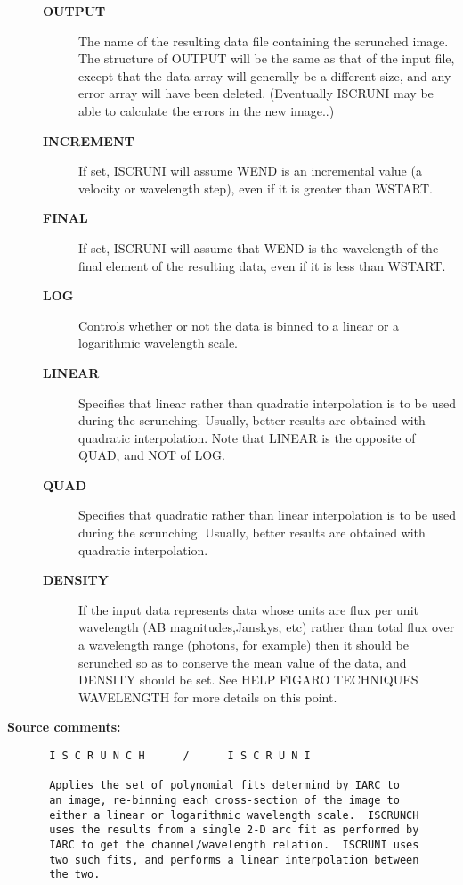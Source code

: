 \begin{description}
\begin{description}
\item [{\bf OUTPUT}]
 The name of the resulting data file containing
 the scrunched image. The structure of OUTPUT will be the
 same as that of the input file, except that the data array
 will generally be a different size, and any error array
 will have been deleted.  (Eventually ISCRUNI may be able
 to calculate the errors in the new image..)
\item [{\bf INCREMENT}]
 If set, ISCRUNI will assume WEND is an incremental value
 (a velocity or wavelength step), even if it is greater
 than WSTART.
\item [{\bf FINAL}]
 If set, ISCRUNI will assume that WEND is the wavelength
 of the final element of the resulting data, even if it
 is less than WSTART.
\item [{\bf LOG}]
 Controls whether or not the data is binned to a linear
 or a logarithmic wavelength scale.
\item [{\bf LINEAR}]
 Specifies that linear rather than quadratic
 interpolation is to be used during the scrunching.  Usually,
 better results are obtained with quadratic interpolation.
 Note that LINEAR is the opposite of QUAD, and NOT of LOG.
\item [{\bf QUAD}]
 Specifies that quadratic rather than linear interpolation
 is to be used during the scrunching.  Usually, better
 results are obtained with quadratic interpolation.
\item [{\bf DENSITY}]
 If the input data represents data whose units are flux per
 unit wavelength (AB magnitudes,Janskys, etc) rather than
 total flux over a wavelength range (photons, for example)
 then it should be scrunched so as to conserve the mean
 value of the data, and DENSITY should be set.  See HELP
 FIGARO TECHNIQUES WAVELENGTH for more details on this point.
\end{description}

\item [{\bf Source comments:}]
\begin{verbatim}
 I S C R U N C H      /      I S C R U N I

 Applies the set of polynomial fits determind by IARC to
 an image, re-binning each cross-section of the image to
 either a linear or logarithmic wavelength scale.  ISCRUNCH
 uses the results from a single 2-D arc fit as performed by
 IARC to get the channel/wavelength relation.  ISCRUNI uses
 two such fits, and performs a linear interpolation between
 the two.


\end{verbatim}
\end{description}
